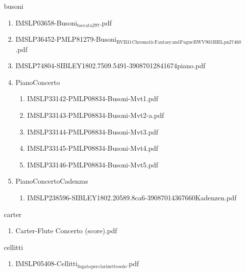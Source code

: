 \documentclass[11pt]{article}
\begin{document}
\item busoni
\label{sec-1-1-1-1-44-17}
\begin{enumerate}
\item IMSLP03658-Busoni$_{\text{toccata297}}$.pdf
\label{sec-1-1-1-1-44-17-1}

\item IMSLP36452-PMLP81279-Busoni$_{\text{BVB31}}$$_{\text{Chromatic}}$$_{\text{Fantasy}}$$_{\text{and}}$$_{\text{Fugue}}$$_{\text{BWV903}}$$_{\text{BH}}$$_{\text{L}}$$_{\text{pn27460}}$.pdf
\label{sec-1-1-1-1-44-17-2}

\item IMSLP74804-SIBLEY1802.7509.5491-39087012841674piano.pdf
\label{sec-1-1-1-1-44-17-3}

\item PianoConcerto
\label{sec-1-1-1-1-44-17-4}
\begin{enumerate}
\item IMSLP33142-PMLP08834-Busoni-Mvt1.pdf
\label{sec-1-1-1-1-44-17-4-1}

\item IMSLP33143-PMLP08834-Busoni-Mvt2-a.pdf
\label{sec-1-1-1-1-44-17-4-2}

\item IMSLP33144-PMLP08834-Busoni-Mvt3.pdf
\label{sec-1-1-1-1-44-17-4-3}

\item IMSLP33145-PMLP08834-Busoni-Mvt4.pdf
\label{sec-1-1-1-1-44-17-4-4}

\item IMSLP33146-PMLP08834-Busoni-Mvt5.pdf
\label{sec-1-1-1-1-44-17-4-5}
\end{enumerate}

\item PianoConcertoCadenzas
\label{sec-1-1-1-1-44-17-5}
\begin{enumerate}
\item IMSLP238596-SIBLEY1802.20589.8ca6-39087014367660Kadenzen.pdf
\label{sec-1-1-1-1-44-17-5-1}
\end{enumerate}
\end{enumerate}

\item carter
\label{sec-1-1-1-1-44-18}
\begin{enumerate}
\item Carter-Flute Concerto (score).pdf
\label{sec-1-1-1-1-44-18-1}
\end{enumerate}

\item cellitti
\label{sec-1-1-1-1-44-19}
\begin{enumerate}
\item IMSLP05408-Cellitti$_{\text{fugato}}$$_{\text{per}}$$_{\text{clarinetto}}$$_{\text{solo}}$.pdf
\label{sec-1-1-1-1-44-19-1}
\end{enumerate}
\end{document}
